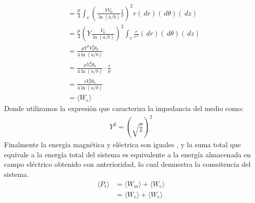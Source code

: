\documentclass[
  11pt,
  letterpaper,
   addpoints,
   answers
  ]{exam}
\begin{document}
\begin{questions}
\begin{solution}
\begin{enumerate}
\begin{align}
    &=\frac{\mu}{4}\int_{v} \left( \frac{ Y V_{0}}{\ln(a/b)} \frac{1}{r}\right)^{2} r(\,dr)(\,d\theta)(\,dz)\\
    &= \frac{\mu}{4}\left( Y\frac{V_{0}}{\ln(a/b)}\right)^{2}\int_{v} \frac{r}{r^{2}} (\,dr)(\,d\theta)(\,dz)\\
    &= \frac{\mu Y^{2} V_{0}^{2}\theta_{0} }{4\ln(a/b)}\\
    &= \frac{\mu  V_{0}^{2}\theta_{0} }{4\ln(a/b)} \cdot \frac{\epsilon}{\mu}\\
    &= \frac{\epsilon V_{0}^{2}\theta_{0} }{4\ln(a/b)}\\
    &= \langle W_{e} \rangle
\end{align}
Donde utilizamos la expresión que caracteriza la impedancia del medio como:
\begin{align}
    Y^{2}= \left( \sqrt{\frac{\epsilon}{\mu}}\right)^{2}
\end{align}
Finalmente la energía magnética y eléctrica son iguales , y la suma total que equivale a la energía total del sistema es equivalente a la energía almacenada en campo eléctrico obtenido con anterioridad, lo cual demuestra la conssitencia del sistema.
\begin{align}
    \langle P_{t} \rangle &= \langle W_{m} \rangle + \langle W_{e} \rangle \\
                         &= \langle W_{e} \rangle + \langle W_{e} \rangle
\end{align}
    \end{enumerate}
\end{solution}
\end{questions}
\newpage
\end{document}
